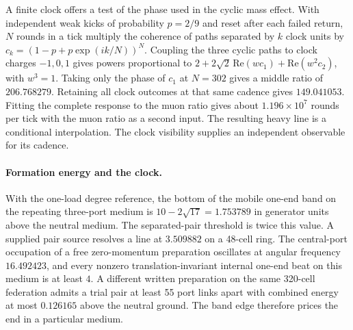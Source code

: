 \documentclass[11pt]{article}
\theoremstyle{definition}
\theoremstyle{remark}
\theoremstyle{plain}
\begin{document}
A finite clock offers a test of the phase used in the cyclic mass
effect. With independent weak kicks of probability $p=2/9$ and reset
after each failed return, $N$ rounds in a tick multiply the coherence
of paths separated by $k$ clock units by
$c_k=(1-p+p\exp(ik/N))^N$. Coupling the three cyclic paths to clock
charges $-1,0,1$ gives powers proportional to
$2+2\sqrt{2}\,\mathrm{Re}(wc_1)+\mathrm{Re}(w^2c_2)$, with $w^3=1$.
Taking only the phase of $c_1$ at $N=302$ gives a middle ratio of
$206.768279$. Retaining all clock outcomes at that same cadence gives
$149.041053$. Fitting the complete response to the muon ratio gives
about $1.196\times10^7$ rounds per tick with the muon ratio as a second input. The resulting heavy line is a conditional interpolation. The clock
visibility supplies an independent observable for its cadence.

\paragraph{Formation energy and the clock.}
With the one-load degree reference, the bottom of the mobile one-end
band on the repeating three-port medium is $10-2\sqrt{17}=1.753789$
in generator units above the neutral medium. The separated-pair
threshold is twice this value. A supplied pair source resolves a line
at $3.509882$ on a 48-cell ring. The central-port occupation of a free
zero-momentum preparation oscillates at angular frequency $16.492423$,
and every nonzero translation-invariant internal one-end beat on this
medium is at least $4$. A different written preparation on the same
320-cell federation admits a trial pair at least 55 port links apart
with combined energy at most $0.126165$ above the neutral ground.
The band edge therefore prices the end in a particular medium.
\end{document}
